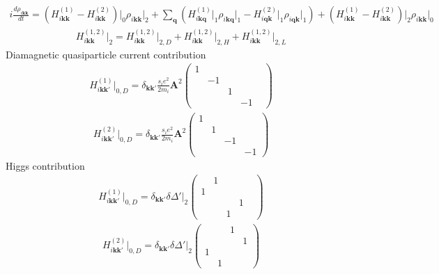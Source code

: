 \documentclass[a4paper]{article}
\begin{document}
\begin{eqnarray*}
  i\frac{d \rho_{i\mathbf{k}\mathbf{k}}}{dt}
  =
    \left( 
      H_{i\mathbf{kk}}^{(1)}  - H_{i\mathbf{kk}}^{(2)} 
    \right)\bigg|_0
    \rho_{i\mathbf{kk}}\big|_2
    +
    \sum_{\mathbf{q}}^{}
    \left( 
    H_{i\mathbf{kq}}^{(1)}\big|_1 \rho_{i\mathbf{kq}}\big|_1 -
    H_{i\mathbf{qk}}^{(2)}\big|_1 \rho_{i\mathbf{qk}}\big|_1
    \right)
    +
    \left( 
      H_{i\mathbf{kk}}^{(1)} - H_{i\mathbf{kk}}^{(2)} 
    \right)\bigg|_2
      \rho_{i\mathbf{kk}}\big|_0
\end{eqnarray*}
\begin{eqnarray*}
  H_{i\mathbf{kk}}^{(1,2)}\big|_2 = 
  H_{i\mathbf{kk}}^{(1,2)}\big|_{2,D}
  +H_{i\mathbf{kk}}^{(1,2)}\big|_{2,H}
  +H_{i\mathbf{kk}}^{(1,2)}\big|_{2,L}
\end{eqnarray*}
Diamagnetic quasiparticle current contribution
\begin{eqnarray*}
  H_{i\mathbf{kk'}}^{(1)}\big|_{0,D}
  =
  \delta_{\mathbf{kk'}} \frac{s_ie^2}{2m_i}\mathbf{A}^2
  \begin{pmatrix}
    1 &  & & \\
     & -1 & & \\
    && 1 &  \\
    &&  & -1& 
  \end{pmatrix}
\end{eqnarray*}
\begin{eqnarray*}
  H_{i\mathbf{kk'}}^{(2)}\big|_{0,D}
  =
  \delta_{\mathbf{kk'}} \frac{s_ie^2}{2m_i}\mathbf{A}^2
  \begin{pmatrix}
    1 &&  & \\
    & 1 &&  \\
     && -1 & \\
    &  &&-1 
  \end{pmatrix}
\end{eqnarray*}
Higgs contribution
\begin{eqnarray*}
  H_{i\mathbf{kk'}}^{(1)}\big|_{0,D}
  =
  \delta_{\mathbf{kk'}} \delta \Delta'\big|_2
  \begin{pmatrix}
     & 1 & & \\
    1 &  & & \\
    &&  & 1 \\
    && 1 &  & 
  \end{pmatrix}
\end{eqnarray*}
\begin{eqnarray*}
  H_{i\mathbf{kk'}}^{(2)}\big|_{0,D}
  =
  \delta_{\mathbf{kk'}} \delta \Delta'\big|_2
  \begin{pmatrix}
     && 1 & \\
    &  && 1 \\
    1 &&  & \\
    & 1 && 
  \end{pmatrix}
\end{eqnarray*}
\end{document}
